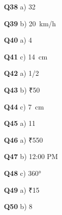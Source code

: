 \textbf{Q38} a) 32\par
\textbf{Q39} b) 20 km/h\par
\textbf{Q40} a) 4\par
\textbf{Q41} c) 14 cm\par
\textbf{Q42} a) 1/2\par
\textbf{Q43} b) ₹50\par
\textbf{Q44} c) 7 cm\par
\textbf{Q45} a) 11\par
\textbf{Q46} a) ₹550\par
\textbf{Q47} b) 12:00 PM\par
\textbf{Q48} c) 360°\par
\textbf{Q49} a) ₹15\par
\textbf{Q50} b) 8\par